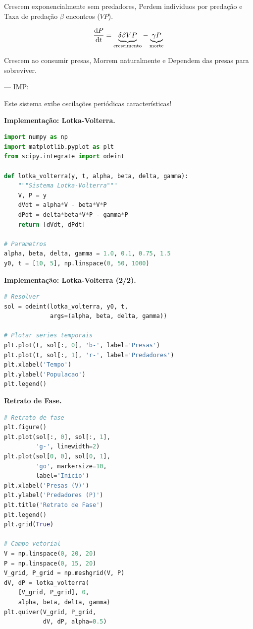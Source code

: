 Crescem exponencialmente sem predadores, Perdem individuos por predação e Taxa de predação $\beta$ encontros ($VP$).

%
\begin{equation*}
\frac{\mathrm{d} P}{\mathrm{d} t} = \underbrace{\delta \beta V P}_{\text{crescimento}} - \underbrace{\gamma P}_{\text{morte}}
\end{equation*}
%

Crescem ao consumir presas, Morrem naturalmente e Dependem das presas para sobreviver.

--- IMP: 

Este sistema exibe oscilações periódicas características!

\textbf{Implementação: Lotka-Volterra.}

%
\begin{lstlisting}[language=Python, caption=Sistema predador-presa, basicstyle=\ttfamily\footnotesize]
import numpy as np
import matplotlib.pyplot as plt
from scipy.integrate import odeint

def lotka_volterra(y, t, alpha, beta, delta, gamma):
    """Sistema Lotka-Volterra"""
    V, P = y
    dVdt = alpha*V - beta*V*P
    dPdt = delta*beta*V*P - gamma*P
    return [dVdt, dPdt]

# Parametros
alpha, beta, delta, gamma = 1.0, 0.1, 0.75, 1.5
y0, t = [10, 5], np.linspace(0, 50, 1000)
\end{lstlisting}
%

\textbf{Implementação: Lotka-Volterra (2/2).}

%
\begin{lstlisting}[language=Python, caption=Resolução e Plotting]
# Resolver
sol = odeint(lotka_volterra, y0, t,
             args=(alpha, beta, delta, gamma))

# Plotar series temporais
plt.plot(t, sol[:, 0], 'b-', label='Presas')
plt.plot(t, sol[:, 1], 'r-', label='Predadores')
plt.xlabel('Tempo')
plt.ylabel('Populacao')
plt.legend()
\end{lstlisting}
%

\textbf{Retrato de Fase.}

%
\begin{lstlisting}[language=Python, caption=Plano de fase, basicstyle=\ttfamily\tiny]
# Retrato de fase
plt.figure()
plt.plot(sol[:, 0], sol[:, 1],
         'g-', linewidth=2)
plt.plot(sol[0, 0], sol[0, 1],
         'go', markersize=10,
         label='Inicio')
plt.xlabel('Presas (V)')
plt.ylabel('Predadores (P)')
plt.title('Retrato de Fase')
plt.legend()
plt.grid(True)

# Campo vetorial
V = np.linspace(0, 20, 20)
P = np.linspace(0, 15, 20)
V_grid, P_grid = np.meshgrid(V, P)
dV, dP = lotka_volterra(
    [V_grid, P_grid], 0,
    alpha, beta, delta, gamma)
plt.quiver(V_grid, P_grid,
           dV, dP, alpha=0.5)
\end{lstlisting}
%

